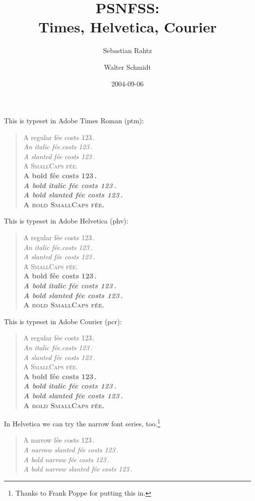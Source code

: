 \documentclass[11pt]{article}
\begin{document}
\frenchspacing
\title{PSNFSS:\\ Times, Helvetica, Courier}
\author{Sebastian Rahtz \and Walter Schmidt}
\date{2004-09-06}
\maketitle
\def\Try#1#2{%
{\fontfamily{#1}\selectfont
This is typeset in #2 (#1): 
\begin{quote}
\raggedright
A regular f\'ee costs 123\,\texteuro.\\
\textit{An italic f\'ee.costs 123\,\texteuro.}\\
\textsl{A slanted f\'ee costs 123\,\texteuro.}\\
\textsc{A SmallCaps f\'ee.}\\
{\bfseries A bold f\'ee costs 123\,\texteuro.\\
 \textit{A bold italic f\'ee costs 123\,\texteuro.}\\
 \textsl{A bold slanted f\'ee costs 123\,\texteuro.}\\
 \textsc{A bold SmallCaps f\'ee.}\\
}
\end{quote}
\par
}}

\Try{ptm}{Adobe Times Roman}
\Try{phv}{Adobe Helvetica}
\Try{pcr}{Adobe Courier}

\textsf{In Helvetica we can try the narrow font series, too.\footnote{Thanks to Frank
  Poppe for putting this in.}}
\begin{quote}
\raggedright
{}\selectfont
\upshape A narrow f\'ee costs 123\,\texteuro.\\
\slshape A narrow slanted f\'ee costs 123\,\texteuro.\\
{\selectfont
\upshape A bold narrow f\'ee costs 123\,\texteuro.\\
\slshape A bold narrow slanted f\'ee costs 123\,\texteuro.
}
\end{quote}
\end{document}

